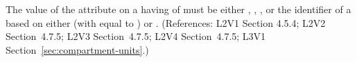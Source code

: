The value of the  attribute on a \Compartment having
 of  must be either ,
, , or the identifier of a
\UnitDefinition based on either  (with  equal
to ) or .  (References: L2V1 Section 4.5.4;
L2V2 Section~4.7.5; L2V3 Section~4.7.5; L2V4 Section~4.7.5; 
L3V1 Section~\ref{sec:compartment-units}.)
